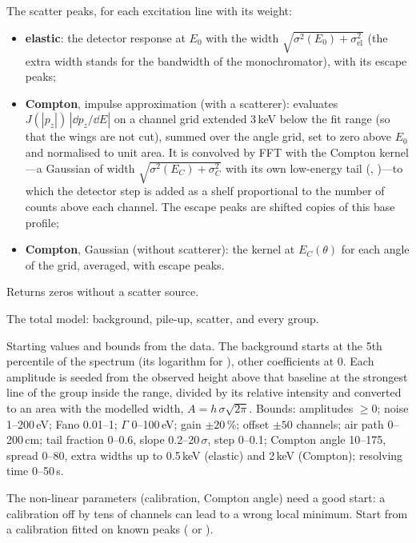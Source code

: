 The scatter peaks, for each excitation line with its weight:
\begin{itemize}[nosep]
\item \textbf{elastic}: the detector response at $E_0$ with the width
  $\sqrt{\sigma^2(E_0)+\sigma_\mathrm{el}^2}$ (the extra width stands for the bandwidth of the
  monochromator), with its escape peaks;
\item \textbf{Compton}, impulse approximation (with a scatterer):  evaluates
  $J(|p_z|)\,|\dd p_z/\dd E|$ on a channel grid extended 3\,keV below the fit range (so that
  the wings are not cut), summed over the angle grid, set to zero above $E_0$ and normalised
  to unit area. It is convolved by FFT with the Compton kernel---a Gaussian of width
  $\sqrt{\sigma^2(E_C)+\sigma_C^2}$ with its own low-energy tail
  (, )---to which the detector step is added
  as a shelf proportional to the number of counts above each channel. The escape peaks are
  shifted copies of this base profile;
\item \textbf{Compton}, Gaussian (without scatterer): the kernel at $E_C(\theta)$ for each
  angle of the grid, averaged, with escape peaks.
\end{itemize}
Returns zeros without a scatter source.

The total model: background, pile-up, scatter, and every group.

Starting values and bounds from the data. The background starts at the 5th percentile of the
spectrum (its logarithm for ), other coefficients at 0. Each amplitude is seeded
from the observed height above that baseline at the strongest line of the group inside the
range, divided by its relative intensity and converted to an area with the modelled width,
$A = h\,\sigma\sqrt{2\pi}$. Bounds: amplitudes $\ge0$; noise 1--200\,eV; Fano 0.01--1;
$\Gamma$ 0--100\,eV; gain $\pm20\,\%$; offset $\pm50$ channels; air path 0--200\,cm; tail
fraction 0--0.6, slope 0.2--20\,$\sigma$, step 0--0.1; Compton angle 10--175\textdegree,
spread 0--80\textdegree, extra widths up to 0.5\,keV (elastic) and 2\,keV (Compton); resolving
time 0--50\,\textmu s.
\begin{hyp}
The non-linear parameters (calibration, Compton angle) need a good start: a calibration off
by tens of channels can lead to a wrong local minimum. Start from a calibration fitted on
known peaks ( or ).
\end{hyp}

